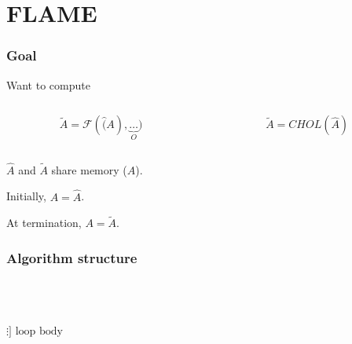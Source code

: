 \documentclass{beamer}
\newcommand*{\opF}{\mathcal{F}}
\def\?#1{}
\begin{document}
\section{FLAME}

\frame{\sectionpage}

\begin{frame}
  \frametitle{Goal}
  Want to compute
  \begin{columns}
    \begin{column}{0.5\textwidth}
      \begin{equation*}
        \widetilde{A} = \opF(\hat(A), \underbrace{\ldots}_{O})
      \end{equation*}
    \end{column}
    \begin{column}{0.5\textwidth}
      \begin{equation*}
        \widetilde{A} = CHOL(\hat{A})
      \end{equation*}
    \end{column}
  \end{columns}

  $\hat{A}$ and $\widetilde{A}$ share memory ($A$).

  Initially, $A = \hat{A}$.

  At termination, $A = \widetilde{A}$.
\end{frame}

\begin{frame}
  \frametitle{Algorithm structure}
  \begin{FlameAlg}
    \\
    \\
    \\
    $\?[\vdots]\text{ loop body}$\\ %
    \\
    \FlaEndDo{}
  \end{FlameAlg}
\end{frame}
\end{document}
